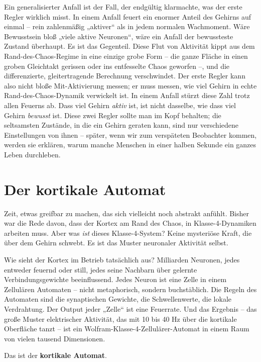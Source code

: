 \documentclass[11pt, twoside, openright]{book}
\begin{document}
Ein generalisierter Anfall ist der Fall, der endgültig klarmachte, was der erste Regler wirklich misst. In einem Anfall feuert ein enormer Anteil des Gehirns auf einmal -- rein zahlenmäßig „aktiver“ als in jedem normalen Wachmoment. Wäre Bewusstsein bloß „viele aktive Neuronen“, wäre ein Anfall der bewussteste Zustand überhaupt. Es ist das Gegenteil. Diese Flut von Aktivität kippt aus dem Rand-des-Chaos-Regime in eine einzige grobe Form -- die ganze Fläche in einen groben Gleichtakt gerissen oder ins entfesselte Chaos geworfen --, und die differenzierte, gleitertragende Berechnung verschwindet. Der erste Regler kann also nicht bloße Mit-Aktivierung messen; er muss messen, wie viel Gehirn in echte Rand-des-Chaos-Dynamik verwickelt ist. In einem Anfall stürzt diese Zahl trotz allen Feuerns ab. Dass viel Gehirn \textit{aktiv} ist, ist nicht dasselbe, wie dass viel Gehirn \textit{bewusst} ist. Diese zwei Regler sollte man im Kopf behalten; die seltsamsten Zustände, in die ein Gehirn geraten kann, sind nur verschiedene Einstellungen von ihnen -- später, wenn wir zum verspäteten Beobachter kommen, werden sie erklären, warum manche Menschen in einer halben Sekunde ein ganzes Leben durchleben.

\section*{Der kortikale Automat}

Zeit, etwas greifbar zu machen, das sich vielleicht noch abstrakt anfühlt. Bisher war die Rede davon, dass der Kortex am Rand des Chaos, in Klasse-4-Dynamiken arbeiten muss. Aber was \textit{ist} dieses Klasse-4-System? Keine mysteriöse Kraft, die über dem Gehirn schwebt. Es ist das Muster neuronaler Aktivität selbst.

Wie sieht der Kortex im Betrieb tatsächlich aus? Milliarden Neuronen, jedes entweder feuernd oder still, jedes seine Nachbarn über gelernte Verbindungsgewichte beeinflussend. Jedes Neuron ist eine Zelle in einem Zellulären Automaten -- nicht metaphorisch, sondern buchstäblich. Die Regeln des Automaten sind die synaptischen Gewichte, die Schwellenwerte, die lokale Verdrahtung. Der Output jeder „Zelle“ ist eine Feuerrate. Und das Ergebnis -- das große Muster elektrischer Aktivität, das mit 10 bis 40 Hz über die kortikale Oberfläche tanzt -- ist ein Wolfram-Klasse-4-Zellulärer-Automat in einem Raum von vielen tausend Dimensionen.

Das ist der \textbf{kortikale Automat}.
\end{document}

